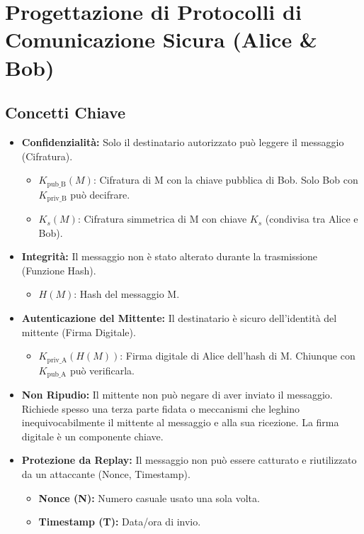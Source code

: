 \section{Progettazione di Protocolli di Comunicazione Sicura (Alice \& Bob)}
\label{sec:protocolli-sicuri}

\subsection{Concetti Chiave}
\begin{itemize}
    \item \textbf{Confidenzialità:} Solo il destinatario autorizzato può leggere il messaggio (Cifratura).
    \begin{itemize}
        \item $K_{\text{pub\_B}}(M)$: Cifratura di M con la chiave pubblica di Bob. Solo Bob con $K_{\text{priv\_B}}$ può decifrare.
        \item $K_s(M)$: Cifratura simmetrica di M con chiave $K_s$ (condivisa tra Alice e Bob).
    \end{itemize}
    \item \textbf{Integrità:} Il messaggio non è stato alterato durante la trasmissione (Funzione Hash).
    \begin{itemize}
        \item $H(M)$: Hash del messaggio M.
    \end{itemize}
    \item \textbf{Autenticazione del Mittente:} Il destinatario è sicuro dell'identità del mittente (Firma Digitale).
    \begin{itemize}
        \item $K_{\text{priv\_A}}(H(M))$: Firma digitale di Alice dell'hash di M. Chiunque con $K_{\text{pub\_A}}$ può verificarla.
    \end{itemize}
    \item \textbf{Non Ripudio:} Il mittente non può negare di aver inviato il messaggio. Richiede spesso una terza parte fidata o meccanismi che leghino inequivocabilmente il mittente al messaggio e alla sua ricezione. La firma digitale è un componente chiave.
    \item \textbf{Protezione da Replay:} Il messaggio non può essere catturato e riutilizzato da un attaccante (Nonce, Timestamp).
    \begin{itemize}
        \item \textbf{Nonce (N):} Numero casuale usato una sola volta.
        \item \textbf{Timestamp (T):} Data/ora di invio.
    \end{itemize}
\end{itemize}


